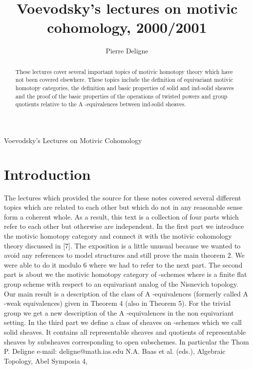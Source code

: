 \documentclass[11pt,a4paper]{article}
\theoremstyle{plain}
\theoremstyle{definition}
\begin{document}
\title{Voevodsky's lectures on motivic cohomology, 2000/2001}
\author{Pierre Deligne}
\date{}
\maketitle

Voevodsky's Lectures on Motivic Cohomology

\begin{abstract}
These lectures cover several important topics of motivic homotopy theory which have not been covered elsewhere. These topics include the definition
of equivariant motivic homotopy categories, the definition and basic properties of
solid and ind-solid sheaves and the proof of the basic properties of the operations of twisted powers and group quotients relative to the A -equivalences between
ind-solid sheaves.
\end{abstract}

\section{Introduction}

The lectures which provided the source for these notes covered several different
topics which are related to each other but which do not in any reasonable sense
form a coherent whole. As a result, this text is a collection of four parts which refer
to each other but otherwise are independent.
In the first part we introduce the motivic homotopy category and connect it with
the motivic cohomology theory discussed in [7]. The exposition is a little unusual
because we wanted to avoid any references to model structures and still prove the
main theorem 2. We were able to do it modulo 6 where we had to refer to the
next part.
The second part is about we the motivic homotopy category of -schemes where
is a finite flat group scheme with respect to an equivariant analog of the Nisnevich
topology. Our main result is a description of the class of A -equivalences (formerly
called A -weak equivalences) given in Theorem 4 (also in Theorem 5). For the trivial group we get a new description of the A -equivalences in the non equivariant
setting.
In the third part we define a class of sheaves on -schemes which we call
solid sheaves. It contains all representable sheaves and quotients of representable
sheaves by subsheaves corresponding to open subschemes. In particular the Thom
P. Deligne
e-mail: deligne@math.ias.edu
N.A. Baas et al. (eds.), Algebraic Topology, Abel Symposia 4,
\end{document}
